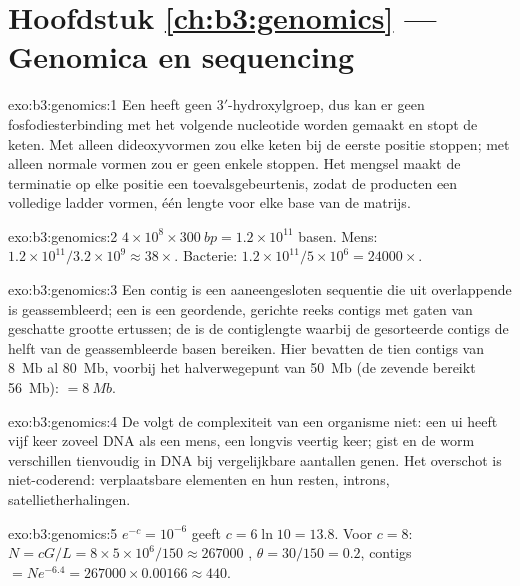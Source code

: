 \section*{Hoofdstuk \ref{ch:b3:genomics} --- Genomica en sequencing}

\begin{solution}{exo:b3:genomics:1}
Een  heeft geen 3$'$-hydroxylgroep, dus kan er geen
fosfodiesterbinding met het volgende nucleotide worden gemaakt en stopt
de keten. Met alleen dideoxyvormen zou elke keten bij de eerste positie
stoppen; met alleen normale vormen zou er geen enkele stoppen. Het
mengsel maakt de terminatie op elke positie een toevalsgebeurtenis,
zodat de producten een volledige ladder vormen, één lengte voor elke
base van de matrijs.
\end{solution}

\begin{solution}{exo:b3:genomics:2}
$4\times 10^{8}\times \qty{300}{bp} = 1.2\times 10^{11}$ basen. Mens:
$1.2\times 10^{11}/3.2\times 10^{9} \approx 38\times$. Bacterie:
$1.2\times 10^{11}/5\times 10^{6} = \num{24000}\times$.
\end{solution}

\begin{solution}{exo:b3:genomics:3}
Een contig is een aaneengesloten sequentie die uit overlappende  is
geassembleerd; een  is een geordende, gerichte reeks contigs met
gaten van geschatte grootte ertussen; de  is de contiglengte waarbij
de gesorteerde contigs de helft van de geassembleerde basen bereiken.
Hier bevatten de tien contigs van \qty{8}{Mb} al \qty{80}{Mb}, voorbij
het halverwegepunt van \qty{50}{Mb} (de zevende bereikt \qty{56}{Mb}):
 $= \qty{8}{Mb}$.
\end{solution}

\begin{solution}{exo:b3:genomics:4}
De  volgt de complexiteit van een organisme niet: een ui
heeft vijf keer zoveel DNA als een mens, een longvis veertig keer;
gist en de worm verschillen tienvoudig in DNA bij vergelijkbare
aantallen genen. Het overschot is niet-coderend: verplaatsbare
elementen en hun resten, introns, satellietherhalingen.
\end{solution}

\begin{solution}{exo:b3:genomics:5}
$e^{-c} = 10^{-6}$ geeft $c = 6\ln 10 = 13.8$. Voor $c = 8$: $N =
cG/L = 8\times 5\times 10^{6}/150 \approx \num{267000}$ , $\theta
= 30/150 = 0.2$, contigs $= N e^{-6.4} = \num{267000}\times 0.00166
\approx 440$.
\end{solution}

